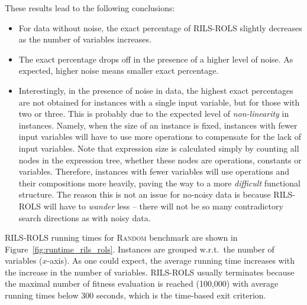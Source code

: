 \documentclass{bmcart}
\begin{document}
These results lead to the following conclusions:

\begin{itemize}
	\item For data without noise, the exact percentage of \textsc{RILS}-\textsc{ROLS} slightly decreases as the  number of variables increases. 
	\item The exact percentage drops off in the presence of a higher level of noise. As expected, higher noise means smaller exact percentage.
	\item Interestingly, in the presence of noise in data, the highest exact percentages are not obtained for instances with a single input variable, but for those with two or three. This is probably due to the expected level of \emph{non-linearity} in instances. Namely, when the size of an instance is fixed, instances with fewer input variables will have to use more operations to compensate for the lack of input variables. Note that expression size is calculated simply by counting all nodes in the expression tree, whether these nodes are operations, constants or variables. Therefore, instances with fewer variables will use operations and their compositions more heavily, paving the way to a more \emph{difficult} functional structure. 
	The reason this is not an issue for no-noisy data is because \textsc{RILS-ROLS} will have to \emph{wander} less -- there will not be so many contradictory search directions as with noisy data.
\end{itemize}

\textsc{RILS}-\textsc{ROLS} running times for \textsc{Random} benchmark are shown in Figure~\ref{fig:runtime_rils_rols}. Instances are grouped w.r.t.\ the number of variables ($x$-axis). 
As one could expect, the average running time increases with the increase in the number of variables. 
\textsc{RILS-ROLS} usually terminates because the maximal number of fitness evaluation is reached (100,000) with average running times below 300 seconds, which is the time-based exit criterion.
\end{document}
